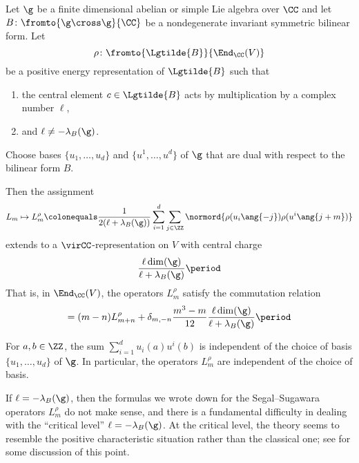 \begin{theorem}\label{thm:SegalSugawara}
	Let $ \g $ be a finite dimensional abelian or simple Lie algebra over $ \CC $ and let $ B \colon \fromto{\g
	\cross \g}{\CC} $ be a nondegenerate invariant symmetric bilinear form.
	Let
	\begin{equation*}
		\rho \colon \fromto{\Lgtilde{B}}{\End_{\CC}(V)}
	\end{equation*} 
	be a positive energy representation of $ \Lgtilde{B} $ such that
	\begin{enumerate}
		\item the central element $ c \in \Lgtilde{B} $ acts by multiplication by a complex number $ \ell $,

		\item and $ \ell \neq - \lambda_B(\g) $.  
	\end{enumerate}
	Choose bases $ \{u_1,\ldots,u_d\} $ and $ \{u^1,\ldots,u^d\} $ of $ \g $ that are dual with respect to the bilinear form $ B $.

	Then the assignment
	\begin{equation*}
		L_m \mapsto L_m^{\rho} \colonequals \frac{1}{2(\ell + \lambda_B(\g))} \sum_{i=1}^d \sum_{j \in \ZZ} \normord{\rho(u_i\ang{-j}) \rho(u^i\ang{j+m})}
	\end{equation*}
	extends to a $ \virCC $-representation on $ V $ with central charge
	\begin{equation*}
		\frac{\ell \dim(\g)}{\ell + \lambda_B(\g)} \period
	\end{equation*}
	That is, in $ \End_{\CC}(V) $, the operators $ L_m^{\rho} $ satisfy the commutation relation
	\begin{equation*}
		[L_m^{\rho},L_n^{\rho}] = (m - n) L_{m+n}^{\rho} + \delta_{m,-n} \frac{m^3 - m}{12} \frac{\ell \dim(\g)}{\ell + \lambda_B(\g)} \period 
	\end{equation*}
\end{theorem}

\begin{remark}
	For $ a,b \in \ZZ $, the sum $ \sum_{i=1}^d u_i(a)u^i(b) $ is independent of the choice of basis $ \{u_1,\ldots,u_d\} $ of $ \g $.
	In particular, the operators $ L_m^{\rho} $ are independent of the choice of basis.
\end{remark}

\begin{remark}
	If $ \ell = -\lambda_{B}(\g) $, then the formulas we wrote down for the Segal--Sugawara operators $ L_m^{\rho}
	$ do not make sense, and there is a fundamental difficulty in dealing with the ``critical level'' $ \ell =
	-\lambda_{B}(\g) $.
	At the critical level, the theory seems to resemble the positive characteristic situation rather than the classical one; see \cite{MO:25592} for some discussion of this point. 
\end{remark}

